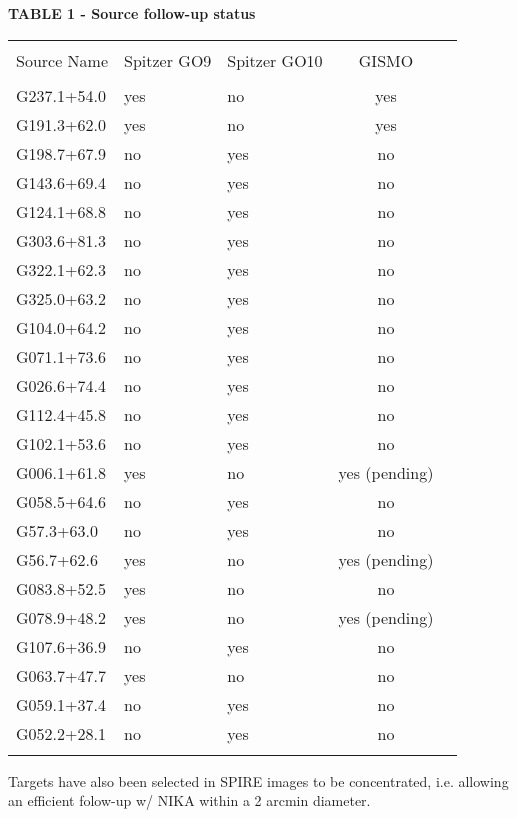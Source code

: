 \documentclass[11pt,a4]{article}
\begin{document}
{\bf  TABLE 1 - Source follow-up status}


{\scriptsize
\bigskip
\begin{tabular}{lllcc}
\hline \\
\hline \\ 
Source Name & Spitzer GO9 & Spitzer GO10 & GISMO \\
\hline \\ 
G237.1+54.0& yes & no & yes\\
G191.3+62.0& yes & no & yes\\
G198.7+67.9& no & yes & no\\
G143.6+69.4& no & yes & no\\
G124.1+68.8& no & yes & no\\
G303.6+81.3& no & yes & no\\
G322.1+62.3& no & yes & no\\
G325.0+63.2& no & yes & no\\
G104.0+64.2& no & yes & no\\
G071.1+73.6& no & yes & no\\
G026.6+74.4& no & yes & no\\
G112.4+45.8& no & yes & no\\
G102.1+53.6& no & yes & no\\
G006.1+61.8& yes & no & yes (pending)\\
G058.5+64.6& no & yes & no\\
G57.3+63.0& no & yes & no\\
G56.7+62.6& yes & no & yes (pending)\\
G083.8+52.5& yes & no & no\\
G078.9+48.2& yes & no & yes (pending)\\
G107.6+36.9& no & yes & no\\
G063.7+47.7& yes & no & no\\
G059.1+37.4& no & yes & no\\
G052.2+28.1& no & yes & no\\
\hline \\
\end{tabular}
}

Targets have also been selected in SPIRE images to be concentrated,
i.e. allowing an efficient folow-up w/ NIKA within a 2 arcmin
diameter.
\end{document}
